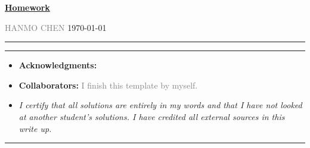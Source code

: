 \documentclass[a4paper]{article}
\begin{document}
\courseheader



\setcounter{hwcnt}{1} %

\begin{center}
  \underline{\bf Homework \thehwcnt} \\
\end{center}
\begin{flushleft}
  \textcolor{gray}{HANMO CHEN}\hfill
  \today
\end{flushleft}
\hrule

\vspace{2em}

\flushleft
\rule{\textwidth}{1pt}
\begin{itemize}
\item {\bf Acknowledgments: \/} 

\item {\bf Collaborators: \/}
  \textcolor{gray}{I finish this template by myself.} 
\item  \emph{I certify that all solutions are entirely in my words and that I have not looked at another student's solutions. I have credited all external sources in this write up.}


  \framebox[\linewidth]{\rule{0pt}{10pt}\textcolor{gray}{\large Hanmo Chen}}
\end{itemize}
\rule{\textwidth}{1pt}


\vspace{2em}
\end{document}
